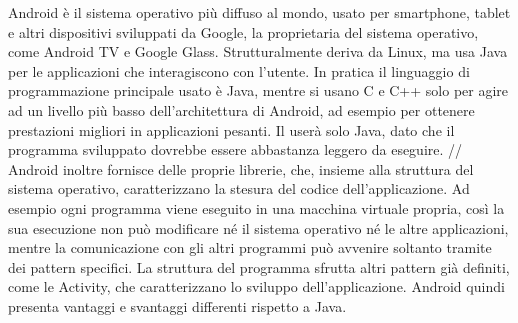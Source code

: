 	Android è il sistema operativo più diffuso al mondo, usato per smartphone, tablet e altri dispositivi sviluppati da Google, la proprietaria del sistema operativo, come Android TV e Google Glass. Strutturalmente deriva da Linux, ma usa Java per le applicazioni che interagiscono con l'utente. In pratica il linguaggio di programmazione principale usato è Java, mentre si usano C e C++ solo per agire ad un livello più basso dell'architettura di Android, ad esempio per ottenere prestazioni migliori in applicazioni pesanti. Il  userà solo Java, dato che il programma sviluppato dovrebbe essere abbastanza leggero da eseguire. //
	Android inoltre fornisce delle proprie librerie, che, insieme alla struttura del sistema operativo, caratterizzano la stesura del codice dell'applicazione. Ad esempio ogni programma viene eseguito in una macchina virtuale propria, così la sua esecuzione non può modificare né il sistema operativo né le altre applicazioni, mentre la comunicazione con gli altri programmi può avvenire soltanto tramite dei pattern specifici. La struttura del programma sfrutta altri pattern già definiti, come le Activity, che caratterizzano lo sviluppo dell'applicazione. Android quindi presenta vantaggi e svantaggi differenti rispetto a Java.
	

